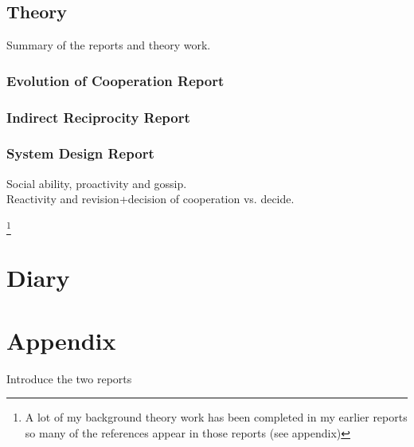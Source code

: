 \documentclass[]{final_report}
\begin{document}
\section{Theory}
Summary of the reports and theory work.
\subsection{Evolution of Cooperation Report}

\subsection{Indirect Reciprocity Report}

\subsection{System Design Report}
Social ability, proactivity and gossip.\\
Reactivity and revision+decision of cooperation vs. decide.\\

\newpage
{}

\footnote{A lot of my background theory work has been completed in my earlier reports so many of the references appear in those reports (see appendix)}
\label{endpage}

\chapter{Diary}

\chapter{Appendix}
\label{appendix}
Introduce the two reports

%

%

%
\end{document}
